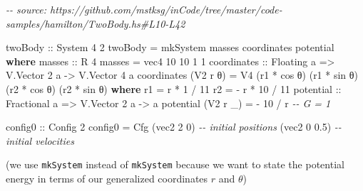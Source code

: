 \documentclass[]{article}
\newenvironment{Shaded}{}{}
\newcommand{\CommentTok}[1]{\textcolor[rgb]{0.38,0.63,0.69}{\textit{#1}}}
\newcommand{\DataTypeTok}[1]{\textcolor[rgb]{0.56,0.13,0.00}{#1}}
\newcommand{\DecValTok}[1]{\textcolor[rgb]{0.25,0.63,0.44}{#1}}
\newcommand{\FloatTok}[1]{\textcolor[rgb]{0.25,0.63,0.44}{#1}}
\newcommand{\FunctionTok}[1]{\textcolor[rgb]{0.02,0.16,0.49}{#1}}
\newcommand{\KeywordTok}[1]{\textcolor[rgb]{0.00,0.44,0.13}{\textbf{#1}}}
\newcommand{\NormalTok}[1]{#1}
\newcommand{\OperatorTok}[1]{\textcolor[rgb]{0.40,0.40,0.40}{#1}}
\newcommand{\OtherTok}[1]{\textcolor[rgb]{0.00,0.44,0.13}{#1}}
\begin{document}
\begin{Shaded}
\begin{Highlighting}[]
\CommentTok{{-}{-} source: https://github.com/mstksg/inCode/tree/master/code{-}samples/hamilton/TwoBody.hs\#L10{-}L42}

\OtherTok{twoBody ::} \DataTypeTok{System} \DecValTok{4} \DecValTok{2}
\NormalTok{twoBody }\OtherTok{=}\NormalTok{ mkSystem masses coordinates potential}
  \KeywordTok{where}
\OtherTok{    masses ::} \DataTypeTok{R} \DecValTok{4}
\NormalTok{    masses }\OtherTok{=}\NormalTok{ vec4 }\DecValTok{10} \DecValTok{10} \DecValTok{1} \DecValTok{1}
\NormalTok{    coordinates}
\OtherTok{        ::} \DataTypeTok{Floating}\NormalTok{ a}
        \OtherTok{=\textgreater{}} \DataTypeTok{V.Vector} \DecValTok{2}\NormalTok{ a}
        \OtherTok{{-}\textgreater{}} \DataTypeTok{V.Vector} \DecValTok{4}\NormalTok{ a}
\NormalTok{    coordinates (}\DataTypeTok{V2}\NormalTok{ r θ) }\OtherTok{=} \DataTypeTok{V4}\NormalTok{ (r1 }\OperatorTok{*} \FunctionTok{cos}\NormalTok{ θ) (r1 }\OperatorTok{*} \FunctionTok{sin}\NormalTok{ θ)}
\NormalTok{                              (r2 }\OperatorTok{*} \FunctionTok{cos}\NormalTok{ θ) (r2 }\OperatorTok{*} \FunctionTok{sin}\NormalTok{ θ)}
      \KeywordTok{where}
\NormalTok{        r1 }\OtherTok{=}\NormalTok{   r }\OperatorTok{*}  \DecValTok{1} \OperatorTok{/} \DecValTok{11}
\NormalTok{        r2 }\OtherTok{=} \OperatorTok{{-}}\NormalTok{ r }\OperatorTok{*} \DecValTok{10} \OperatorTok{/} \DecValTok{11}
\NormalTok{    potential}
\OtherTok{        ::} \DataTypeTok{Fractional}\NormalTok{ a}
        \OtherTok{=\textgreater{}} \DataTypeTok{V.Vector} \DecValTok{2}\NormalTok{ a}
        \OtherTok{{-}\textgreater{}}\NormalTok{ a}
\NormalTok{    potential (}\DataTypeTok{V2}\NormalTok{ r \_) }\OtherTok{=} \OperatorTok{{-}} \DecValTok{10} \OperatorTok{/}\NormalTok{ r       }\CommentTok{{-}{-} G = 1}

\OtherTok{config0 ::} \DataTypeTok{Config} \DecValTok{2}
\NormalTok{config0 }\OtherTok{=} \DataTypeTok{Cfg}\NormalTok{ (vec2 }\DecValTok{2}   \DecValTok{0}\NormalTok{)  }\CommentTok{{-}{-} initial positions}
\NormalTok{              (vec2 }\DecValTok{0} \FloatTok{0.5}\NormalTok{)  }\CommentTok{{-}{-} initial velocities}
\end{Highlighting}
\end{Shaded}

(we use \texttt{mkSystem} instead of \texttt{mkSystem\textquotesingle{}} because
we want to state the potential energy in terms of our generalized coordinates
\(r\) and \(\theta\))
\end{document}
